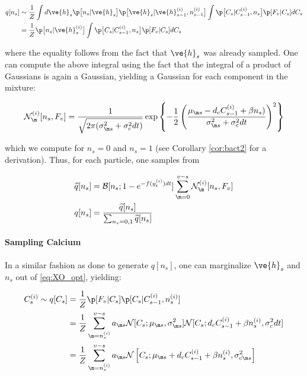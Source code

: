 \begin{align}
\nonumber q[n_s] &\sim \frac{1}{Z} \int d\ve{h}_s  \p \big[ n_s | \ve{h}_s \big] \p \big[ \ve{h}_s | \ve{h}^{(i)}_{s-1}, n_{s-1}^{(i)} \big] \int  \p \big[ C_s | C^{(i)}_{s-1}, n_s \big] \p[F_v|C_s] dC_s
\\&=\frac{1}{Z} \p \big[ n_s | \ve{h}^{(i)}_s \big] \int \p \big[ C_s | C^{(i)}_{s-1}, n_s \big] \p[F_v | C_s] dC_s
\end{align}

\noindent where the equality follows from the fact that $\ve{h}_s$ was already sampled. One can compute the above integral using the fact that the integral of a product of Gaussians is again a Gaussian, yielding a Gaussian for each component in the mixture:

\begin{align} \label{eq:Z_s}
\mathcal{N}_{\m}^{(i)}[n_s, F_v] =
\frac{1}{\sqrt{2 \pi (\sigma_{\m s}^2 + \sigma_c^2 dt)}} \exp \left\{-\frac{1}{2}\left(\frac{\mu_{\m s}-d_c C_{s-1}^{(i)} + \beta n_s)} {\sigma_{\m s}^2 + \sigma_c^2 dt}\right)^2\right\}
\end{align}


\noindent which we compute for $n_s=0$ and $n_s=1$ (see Corollary \ref{cor:bact2}  for a derivation).  Thus, for each particle, one samples from

\begin{align} \label{eq:qn}
\widehat{q}[n_s]&=\mathcal{B}[n_s; 1-e^{-f(y_t^{(i)}) dt}] \sum_{\m=0}^{v-s} \mathcal{N}_{\m}^{(i)}[n_s, F_v]\\
q[n_s]&=\frac{\widehat{q}[n_s]}{\sum_{n_s=0,1} \widehat{q}[n_s]}
\end{align}

\paragraph{Sampling Calcium}

In a similar fashion as done to generate $q[n_s]$, one can marginalize $\ve{h}_s$ and \emph{$n_s$} out of \eqref{eq:XO_opt}, yielding:

\begin{equation} \label{eq:qC}
\begin{split}
C_s^{(i)} \sim q[C_s] &= \frac{1}{Z}  \p[F_v | C_s] \p[C_s | C_{s-1}^{(i)}, n_s^{(i)}]
\\&= \frac{1}{Z}  \sum_{\m=n_s^{(i)}}^{v-s} a_{\m s} \mathcal{N}[C_s; \mu_{\m s}, \sigma_{\m s}^2] \mathcal{N}[C_s; d_c C_{s-1}^{(i)} + \beta n_s^{(i)}, \sigma_c^2 dt]
\\ &= \frac{1}{Z}  \sum_{\m=n_s^{(i)}}^{v-s} a_{\m s} \mathcal{N}\left[C_s; \mu_{\m s} + d_c C_{s-1}^{(i)} + \beta n_s^{(i)}, \sigma_{c\m s}^2 \right]
\end{split}
\end{equation}

